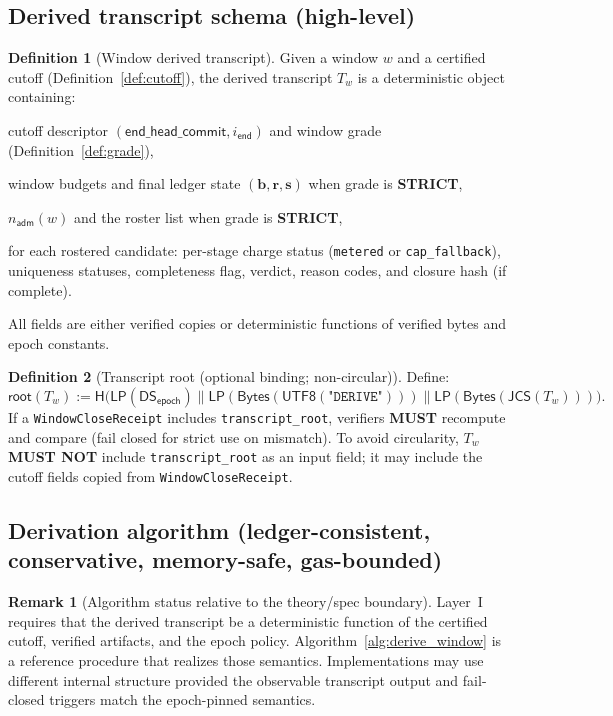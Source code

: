 \documentclass[11pt]{article}
\newcommand{\MUST}{\textbf{MUST}}
\newcommand{\MUSTNOT}{\textbf{MUST NOT}}
\newcommand{\code}[1]{\texttt{#1}}
\newcommand{\1}{\mathbf{1}}
\newcommand{\Hash}{\mathsf{H}}
\newcommand{\DS}{\mathsf{DS}}
\newcommand{\LP}{\mathsf{LP}}
\theoremstyle{definition}
\newtheorem{definition}{Definition}
\newtheorem{remark}{Remark}
\theoremstyle{plain}
\begin{document}
\subsection{Derived transcript schema (high-level)}

\begin{definition}[Window derived transcript]
\label{def:transcript}
Given a window $w$ and a certified cutoff (Definition~\ref{def:cutoff}), the derived transcript $T_w$ is a deterministic object containing:
\begin{tightitemize}
\item cutoff descriptor $(\textsf{end\_head\_commit}, i_{\textsf{end}})$ and window grade (Definition~\ref{def:grade}),
\item window budgets and final ledger state $(\mathbf{b},\mathbf{r},\mathbf{s})$ when grade is \textbf{STRICT},
\item $n_{\textsf{adm}}(w)$ and the roster list when grade is \textbf{STRICT},
\item for each rostered candidate: per-stage charge status (\code{metered} or \code{cap\_fallback}), uniqueness statuses, completeness flag, verdict, reason codes, and closure hash (if complete).
\end{tightitemize}
All fields are either verified copies or deterministic functions of verified bytes and epoch constants.
\end{definition}

\begin{definition}[Transcript root (optional binding; non-circular)]
\label{def:transcript_root}
Define:
\[
\textsf{root}(T_w):=\Hash\big(\LP(\DS_{\textsf{epoch}})\|\LP(\mathsf{Bytes}(\textsf{UTF8}(\texttt{"DERIVE"})))\|\LP(\mathsf{Bytes}(\textsf{JCS}(T_w)))\big).
\]
If a \code{WindowCloseReceipt} includes \code{transcript\_root}, verifiers \MUST{} recompute and compare (fail closed for strict use on mismatch). To avoid circularity, $T_w$ \MUSTNOT{} include \code{transcript\_root} as an input field; it may include the cutoff fields copied from \code{WindowCloseReceipt}.
\end{definition}

\subsection{Derivation algorithm (ledger-consistent, conservative, memory-safe, gas-bounded)}

\begin{remark}[Algorithm status relative to the theory/spec boundary]
Layer~I requires that the derived transcript be a deterministic function of the certified cutoff, verified artifacts, and the epoch policy. Algorithm~\ref{alg:derive_window} is a reference procedure that realizes those semantics. Implementations may use different internal structure provided the observable transcript output and fail-closed triggers match the epoch-pinned semantics.
\end{remark}
\end{document}
